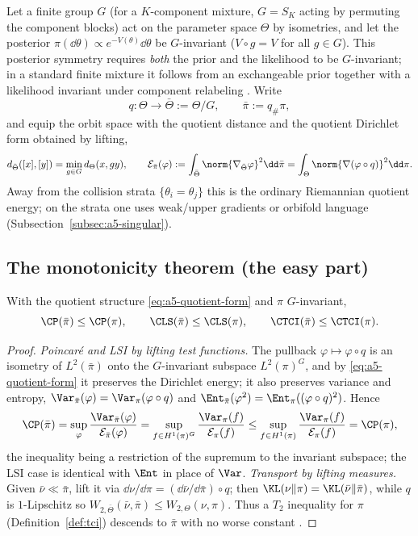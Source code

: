 \documentclass[../../main.tex]{subfiles}
\begin{document}
Let a finite group $G$ (for a $K$-component mixture, $G=S_K$ acting by permuting the component
blocks) act on the parameter space $\Theta$ by isometries, and let the posterior
$\pi(\dd\theta)\propto e^{-V(\theta)}\dd\theta$ be $G$-invariant ($V\circ g=V$ for all
$g\in G$). This posterior symmetry requires \emph{both} the prior and the likelihood to be
$G$-invariant; in a standard finite mixture it follows from an exchangeable prior together with
a likelihood invariant under component relabeling \cite{Celeux1998,JasraHolmesStephens2005}. Write
\[
  q:\Theta\to\bar\Theta:=\Theta/G,\qquad \bar\pi:=q_\#\pi,
\]
and equip the orbit space with the quotient distance and the quotient Dirichlet form obtained
by lifting,
\begin{equation}\label{eq:a5-quotient-form}
  d_{\bar\Theta}([x],[y])=\min_{g\in G}d_\Theta(x,gy),
  \qquad
  \mathcal E_{\bar\pi}(\varphi):=\int_{\bar\Theta}\norm{\nabla_{\bar\Theta}\varphi}^2\dd\bar\pi
  =\int_{\Theta}\norm{\nabla(\varphi\circ q)}^2\dd\pi .
\end{equation}
Away from the collision strata $\{\theta_i=\theta_j\}$ this is the ordinary Riemannian quotient
energy; on the strata one uses weak/upper gradients or orbifold language
(Subsection~\ref{subsec:a5-singular}).

\subsection{The monotonicity theorem (the easy part)}
\label{subsec:a5-monotone}

\begin{theorem}
\label{thm:a5-monotone}
With the quotient structure \eqref{eq:a5-quotient-form} and $\pi$ $G$-invariant,
\[
  \CP(\bar\pi)\le\CP(\pi),\qquad
  \CLS(\bar\pi)\le\CLS(\pi),\qquad
  \CTCI(\bar\pi)\le\CTCI(\pi).
\]
\end{theorem}

\begin{proof}
\emph{Poincar\'e and LSI by lifting test functions.} The pullback $\varphi\mapsto\varphi\circ q$
is an isometry of $L^2(\bar\pi)$ onto the $G$-invariant subspace $L^2(\pi)^G$, and by
\eqref{eq:a5-quotient-form} it preserves the Dirichlet energy; it also preserves variance and
entropy, $\Var_{\bar\pi}(\varphi)=\Var_\pi(\varphi\circ q)$ and
$\Ent_{\bar\pi}(\varphi^2)=\Ent_\pi((\varphi\circ q)^2)$. Hence
\[
  \CP(\bar\pi)=\sup_{\varphi}\frac{\Var_{\bar\pi}(\varphi)}{\mathcal E_{\bar\pi}(\varphi)}
  =\sup_{f\in H^1(\pi)^G}\frac{\Var_\pi(f)}{\mathcal E_\pi(f)}
  \le\sup_{f\in H^1(\pi)}\frac{\Var_\pi(f)}{\mathcal E_\pi(f)}=\CP(\pi),
\]
the inequality being a restriction of the supremum to the invariant subspace; the LSI case is
identical with $\Ent$ in place of $\Var$.
\emph{Transport by lifting measures.} Given $\bar\nu\ll\bar\pi$, lift it via
$\dd\nu/\dd\pi=(\dd\bar\nu/\dd\bar\pi)\circ q$; then $\KL(\nu\|\pi)=\KL(\bar\nu\|\bar\pi)$,
while $q$ is $1$-Lipschitz so $W_{2,\bar\Theta}(\bar\nu,\bar\pi)\le W_{2,\Theta}(\nu,\pi)$.
Thus a $T_2$ inequality for $\pi$ (Definition~\ref{def:tci}) descends to $\bar\pi$ with no
worse constant \cite{GozlanRobertoSamson2013}.
\end{proof}
\end{document}
